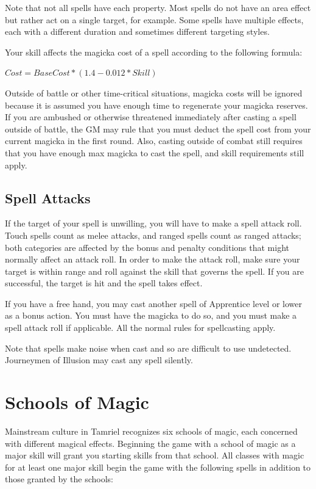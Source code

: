 \documentclass[12pt]{book}
\begin{document}
Note that not all spells have each property. Most spells do not have an area effect but rather act on a single target, for example. Some spells have multiple effects, each with a different duration and sometimes different targeting styles.

Your skill affects the magicka cost of a spell according to the following formula:

$Cost=Base Cost*(1.4-0.012*Skill)$

Outside of battle or other time-critical situations, magicka costs will be ignored because it is assumed you have enough time to regenerate your magicka reserves. If you are ambushed or otherwise threatened immediately after casting a spell outside of battle, the GM may rule that you must deduct the spell cost from your current magicka in the first round. Also, casting outside of combat still requires that you have enough max magicka to cast the spell, and skill requirements still apply.

\subsection{Spell Attacks}

If the target of your spell is unwilling, you will have to make a spell attack roll. Touch spells count as melee attacks, and ranged spells count as ranged attacks; both categories are affected by the bonus and penalty conditions that might normally affect an attack roll. In order to make the attack roll, make sure your target is within range and roll against the skill that governs the spell. If you are successful, the target is hit and the spell takes effect.

If you have a free hand, you may cast another spell of Apprentice level or lower as a bonus action. You must have the magicka to do so, and you must make a spell attack roll if applicable. All the normal rules for spellcasting apply.

Note that spells make noise when cast and so are difficult to use undetected. Journeymen of Illusion may cast any spell silently.

\section{Schools of Magic}

Mainstream culture in Tamriel recognizes six schools of magic, each concerned with different magical effects. Beginning the game with a school of magic as a major skill will grant you starting skills from that school. All classes with magic for at least one major skill begin the game with the following spells in addition to those granted by the schools:
\end{document}
